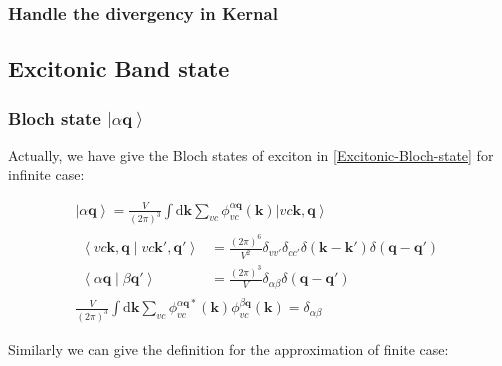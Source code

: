 \subsubsection{Handle the divergency in Kernal}


\subsection{Excitonic Band state}

\subsubsection{Bloch state $\left| \alpha\boldsymbol{q} \right\rangle$}

Actually, we have give the Bloch states of exciton in \cref{Excitonic-Bloch-state} for infinite case:

\begin{equation}
  \begin{gathered}
    \left| \alpha \boldsymbol{q} \right\rangle 
    = \frac{V}{(2\pi)^3} \int \mathrm{d}\boldsymbol{k} \sum_{vc} \phi_{vc}^{\alpha \boldsymbol{q}}(\boldsymbol{k}) 
      \left| v c \boldsymbol{k}, \boldsymbol{q} \right\rangle \\
    \begin{aligned}
      \left\langle v c \boldsymbol{k}, \boldsymbol{q} \middle| v c \boldsymbol{k}', \boldsymbol{q}' \right\rangle
        &= \frac{(2\pi)^6}{V^2} \delta_{vv'} \delta_{cc'} \delta(\boldsymbol{k}-\boldsymbol{k}') \delta(\boldsymbol{q}-\boldsymbol{q}') \\
      \left\langle \alpha \boldsymbol{q} \middle| \beta \boldsymbol{q}' \right\rangle
        &= \frac{(2\pi)^3}{V} \delta_{\alpha\beta} \delta(\boldsymbol{q}-\boldsymbol{q}') 
    \end{aligned} \\
    \frac{V}{(2\pi)^3} \int \mathrm{d}\boldsymbol{k} \sum_{vc} 
      \phi_{vc}^{\alpha \boldsymbol{q}*}(\boldsymbol{k}) \phi_{vc}^{\beta \boldsymbol{q}}(\boldsymbol{k}) 
      = \delta_{\alpha\beta}
  \end{gathered}
\end{equation}

\noindent
Similarly we can give the definition for the approximation of finite case:

